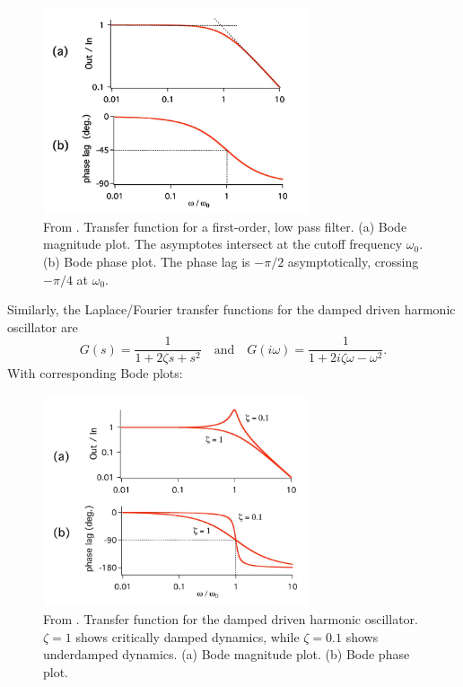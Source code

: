 \documentclass{book}
\theoremstyle{definition}
\newcommand{\f}[2]{\frac{#1}{#2}}
\begin{document}
\begin{figure}[!htb]
	\centering
	\includegraphics[width=0.7\textwidth]{images/bode-1st-order}
	\caption{From \cite{bechhoefer2005feedback}. Transfer function for a first-order, low pass filter. (a) Bode magnitude plot. The asymptotes intersect at the cutoff frequency $\omega_0$.  (b) Bode phase plot. The phase lag is $-\pi/2$ asymptotically, crossing $-\pi/4$ at $\omega_0$. }
\end{figure}




Similarly, the Laplace/Fourier transfer functions for the damped driven harmonic oscillator are 
\begin{equation*}
G(s) = \f{1}{1 + 2\zeta s + s^2} \quad \text{and}\quad G(i\omega) = \f{1}{1+ 2i\zeta\omega - \omega^2}.
\end{equation*}
With corresponding Bode plots:

\begin{figure}[!htb]
	\centering
	\includegraphics[width=0.7\textwidth]{images/bode-2nd-order}
	\caption{From \cite{bechhoefer2005feedback}. Transfer function for the damped driven harmonic oscillator. $\zeta = 1$ shows critically damped dynamics, while $\zeta = 0.1$ shows underdamped dynamics. (a) Bode magnitude plot.  (b) Bode phase plot. }
\end{figure}
\end{document}
